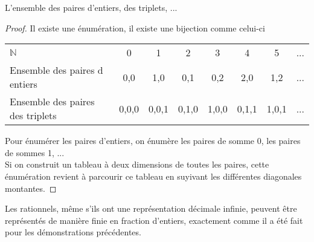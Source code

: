 \begin{myexem}
  L'ensemble des paires d'entiers, des triplets, ...
    \begin{proof}
        Il existe une énumération, il existe une bijection comme celui-ci  
      
       \begin{tabular}{ l c c  c  c c c  r }
 	  $\mathbb{N}$  & 0 & 1 & 2  & 3 & 4 & 5 & ...  \\

 	 Ensemble des paires d entiers & {0,0} & {1,0} & {0,1} & {0,2} & {2,0} & {1,2}  & ... \\
     Ensemble des paires des triplets & {0,0,0} & {0,0,1} & {0,1,0} & {1,0,0} & {0,1,1} & {1,0,1}  & ... \\
	\end{tabular}
	Pour énumérer les paires d'entiers, on énumère les paires de somme 0, les paires de sommes 1, ...  \\
	Si on construit un tableau à deux dimensions de toutes les paires, cette énumération revient à parcourir ce tableau en suyivant les différentes diagonales montantes.  
    \end{proof}   
\end{myexem}
  
\begin{myexem}
 Les rationnels, même s'ils ont une représentation décimale infinie, peuvent être représentés de manière finie en fraction d'entiers, exactement comme il a été fait pour les démonstrations précédentes. 
 \end{myexem}
  
